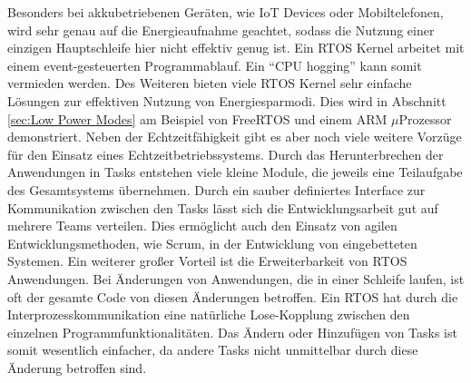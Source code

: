 Besonders bei akkubetriebenen Geräten, wie IoT Devices oder Mobiltelefonen, wird sehr genau auf die Energieaufnahme geachtet, sodass die Nutzung einer einzigen Hauptschleife hier nicht effektiv genug ist. Ein RTOS Kernel arbeitet mit einem event-gesteuerten Programmablauf. Ein "`CPU hogging"' kann somit vermieden werden. Des Weiteren bieten viele RTOS Kernel sehr einfache Lö\-sun\-gen zur effektiven Nutzung von Energiesparmodi. Dies wird in Abschnitt \ref{sec:Low Power Modes} am Beispiel von FreeRTOS und einem ARM $\mu$Prozessor demonstriert. Neben der Echt\-zeit\-fähig\-keit gibt es aber noch viele weitere Vorzüge für den Einsatz eines Echtzeitbetriebssystems. Durch das Herunterbrechen der Anwendungen in Tasks entstehen viele kleine Module, die jeweils eine Teilaufgabe des Gesamtsystems über\-neh\-men. Durch ein sauber definiertes Interface zur Kommunikation zwischen den Tasks lässt sich die Entwicklungsarbeit gut auf mehrere Teams verteilen. Dies ermöglicht auch den Einsatz von agilen Entwicklungsmethoden, wie Scrum, in der Entwicklung von eingebetteten Systemen. Ein weiterer großer Vorteil ist die Erweiterbarkeit von RTOS Anwendungen. Bei Änderungen von Anwendungen, die in einer Schleife laufen, ist oft der gesamte Code von diesen Änderungen betroffen. Ein RTOS hat durch die Interprozesskommunikation eine natürliche Lose-Kopplung zwischen den einzelnen Programmfunktionalitäten. Das Än\-dern oder Hinzufügen von Tasks ist somit wesentlich einfacher, da andere Tasks nicht unmittelbar durch diese Än\-der\-ung betroffen sind. 